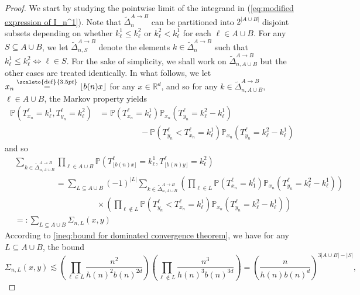 \documentclass[12pt]{article}
\newcommand{\RR}{\mathbb R}
\newcommand{\PP}{\mathbb P}
\newcommand{\1}{\mathds{1}}
\newcommand{\eqdef}{\stackrel{\scaleto{\mathrm{def}}{3.5pt}}{=}}
\numberwithin{equation}{section}
\begin{document}
\begin{proof}
    We start by studying the pointwise limit of the integrand in (\ref{eq:modified expression of I_n^1}). Note that $\widetilde\Delta_n^{A\rightarrow B}$ can be partitioned into $2^{|A\cup B|}$ disjoint subsets depending on whether $k_\ell^1\le k_\ell^2$ or $k_\ell^2<k_\ell^1$ for each $\ell\in A\cup B$. For any $S\subseteq A\cup B$, we let $\widetilde \Delta_{n,S}^{A\rightarrow B}$ denote the elements $k\in\widetilde\Delta_n^{A\rightarrow B}$ such that $k_\ell^1\le k_\ell^2\iff \ell\in S$. For the sake of simplicity, we shall work on $\widetilde\Delta_{n,A\cup B}^{A\rightarrow B}$ but the other cases are treated identically. In what follows, we let $x_n\eqdef\lfloor b(n) x\rfloor$ for any $x\in\RR^d$, and so for any $k\in\widetilde\Delta_{n,A\cup B}^{A\rightarrow B}$, $\ell\in A\cup B$, the Markov property yields
    \begin{align*}
        \PP\left(T_{x_n}^\ell=k_\ell^1,T_{y_n}^\ell=k_\ell^2\right)&=\PP\left(T_{x_n}^\ell=k_\ell^1\right)\PP_{x_n}\left(T_{y_n}^\ell=k_\ell^2-k_\ell^1\right)\\
        &\hspace{5em}-\PP\left(T_{y_n}^\ell<T_{x_n}^\ell=k^1_\ell \right)\PP_{x_n}(T_{y_n}^\ell=k_\ell^2-k_\ell^1)
    \end{align*}
    and so
    \begin{align*}
        &\sum_{k\in\widetilde\Delta_{n,A\cup B}^{A\rightarrow B}}\prod_{\ell\in A\cup B}\PP\left(T_{\lfloor b(n)x\rfloor}^{\ell}=k^1_{\ell},T_{\lfloor b(n)y\rfloor}^{\ell}=k_\ell^2\right)\\
        &\hspace{5em}=\sum_{L\subseteq A\cup B}(-1)^{|L|}\sum_{k\in\widetilde\Delta_{n,A\cup B}^{A\rightarrow B}}\left(\prod_{\ell\in L}\PP\left(T_{x_n}^\ell=k_1^\ell\right)\PP_{x_n}\left(T_{y_n}^\ell=k_\ell^2-k_\ell^1\right)\right)\\
        &\hspace{10em}\times\left(\prod_{\ell\notin L}\PP\left(T_{y_n}^\ell<T_{x_n}^\ell=k^1_\ell \right)\PP_{x_n}(T_{y_n}^\ell=k_\ell^2-k_\ell^1)\right)\\
        &=:\sum_{L\subseteq A\cup B}\Sigma_{n,L}(x,y)
    \end{align*}
    According to \eqref{ineq:bound for dominated convergence theorem}, we have for any $L\subseteq A\cup B$, the bound
    \begin{equation*}
        \Sigma_{n,L}(x,y)\lesssim\left(\prod_{\ell\in L}\frac{n^2}{h(n)^2b(n)^{2d}}\right)\left(\prod_{\ell\notin L}\frac{n^3}{h(n)^3b(n)^{3d}}\right)=\left(\frac{n}{h(n)b(n)^d}\right)^{3|A\cup B|-|S|},

\end{equation*}
\end{proof}
\end{document}
